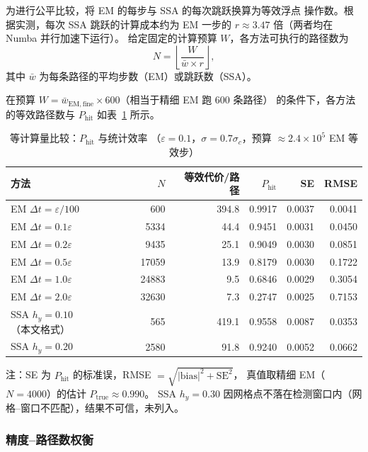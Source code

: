为进行公平比较，将 EM 的每步与 SSA 的每次跳跃换算为等效浮点
操作数。根据实测，每次 SSA 跳跃的计算成本约为 EM 一步的
$r \approx 3.47$ 倍（两者均在 Numba 并行加速下运行）。
给定固定的计算预算 $W$，各方法可执行的路径数为
\[
N = \left\lfloor \frac{W}{\bar w \times r} \right\rfloor,
\]
其中 $\bar w$ 为每条路径的平均步数（EM）或跳跃数（SSA）。

在预算 $W = \bar w_\mathrm{EM,fine} \times 600$（相当于精细 EM 跑 600 条路径）
的条件下，各方法的等效路径数与 $P_\mathrm{hit}$ 如表~\ref{tab:equal-budget}
所示。

\begin{table}[!htbp]
	\centering
	\caption{等计算量比较：$P_\mathrm{hit}$ 与统计效率
		（$\varepsilon=0.1$，$\sigma = 0.7\sigma_c$，预算 $\approx 2.4\times10^5$ EM 等效步）}
	\label{tab:equal-budget}
	\begin{tabular}{lrrrrr}
		\toprule
		方法 & $N$ & 等效代价/路径 & $P_\mathrm{hit}$ & SE & RMSE \\
		\midrule
		EM $\Delta t=\varepsilon/100$ & 600    & 394.8  & 0.9917 & 0.0037 & 0.0041 \\
		EM $\Delta t=0.1\varepsilon$  & 5334   & 44.4   & 0.9451 & 0.0031 & 0.0450 \\
		EM $\Delta t=0.2\varepsilon$  & 9435   & 25.1   & 0.9049 & 0.0030 & 0.0851 \\
		EM $\Delta t=0.5\varepsilon$  & 17059  & 13.9   & 0.8179 & 0.0030 & 0.1722 \\
		EM $\Delta t=1.0\varepsilon$  & 24883  & 9.5    & 0.6846 & 0.0029 & 0.3054 \\
		EM $\Delta t=2.0\varepsilon$  & 32630  & 7.3    & 0.2747 & 0.0025 & 0.7153 \\
		\midrule
		SSA $h_y=0.10$（本文格式）    & 565    & 419.1  & 0.9558 & 0.0087 & 0.0353 \\
		SSA $h_y=0.20$                & 2580   & 91.8   & 0.9240 & 0.0052 & 0.0662 \\
		\bottomrule
	\end{tabular}
	\begin{minipage}{\textwidth}
		\vspace{4pt}
		\small 注：SE 为 $P_\mathrm{hit}$ 的标准误，RMSE $=\sqrt{|\mathrm{bias}|^2 + \mathrm{SE}^2}$，
		真值取精细 EM（$N=4000$）的估计 $P_\mathrm{true}\approx0.990$。
		SSA $h_y=0.30$ 因网格点不落在检测窗口内（网格--窗口不匹配），结果不可信，未列入。
	\end{minipage}
\end{table}

\subsubsection{精度--路径数权衡}

